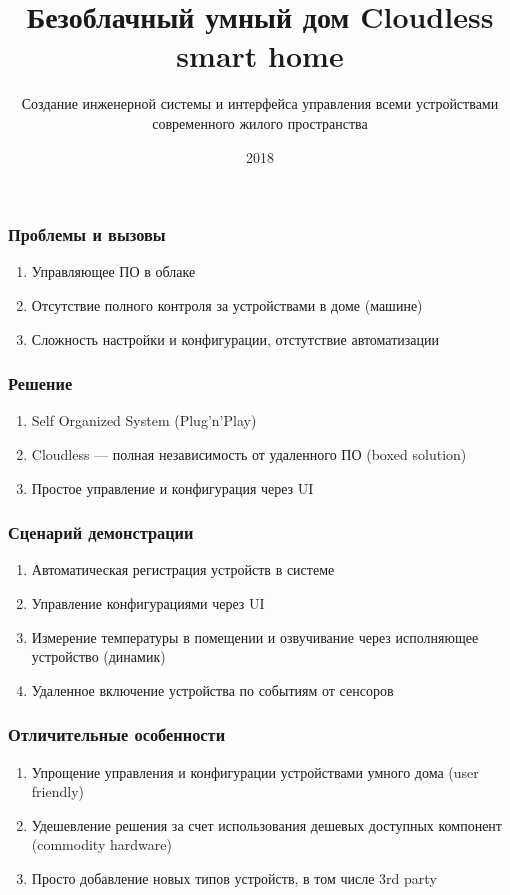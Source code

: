 \documentclass[14pt]{beamer}
\title{\textbf{Безоблачный умный дом} Cloudless smart home}
\author{Создание инженерной системы и интерфейса управления всеми устройствами
  современного жилого пространства
}
\date{2018}
\begin{document}
\maketitle

\begin{frame}
  \frametitle{Проблемы и вызовы}
  \begin{enumerate}
    \item Управляющее ПО в облаке
    \item Отсутствие полного контроля за устройствами в доме (машине)
    \item Сложность настройки и конфигурации, отстутствие автоматизации
  \end{enumerate}
\end{frame}

\begin{frame}
  \frametitle{Решение}
  \begin{enumerate}
    \item Self Organized System (Plug'n'Play)
    \item Cloudless --- полная независимость от удаленного ПО (boxed solution)
    \item Простое управление и конфигурация через UI
  \end{enumerate}
\end{frame}

\begin{frame}
  \frametitle{Сценарий демонстрации}
  \begin{enumerate}
    \item Автоматическая регистрация устройств в системе
    \item Управление конфигурациями через UI
    \item Измерение температуры в помещении и озвучивание через
      исполняющее устройство (динамик)
    \item Удаленное включение устройства по событиям от сенсоров
  \end{enumerate}
\end{frame}

\begin{frame}
  \frametitle{Отличительные особенности}
  \begin{enumerate}
    \item Упрощение управления и конфигурации устройствами умного
      дома (user friendly)
    \item Удешевление решения за счет использования дешевых
      доступных компонент (commodity hardware)
    \item Просто добавление новых типов устройств, в том числе 
      3rd party
  \end{enumerate}
\end{frame}
\end{document}

